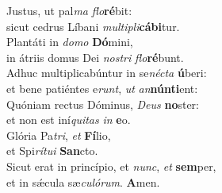\evenverse Justus, ut pal\textit{ma} \textit{flo}\textbf{ré}bit:~\*\\
\evenverse sicut cedrus Líbani \textit{mul}\textit{ti}\textit{pli}\textbf{cá}\textbf{bi}tur.\\
\oddverse Plantáti in \textit{do}\textit{mo} \textbf{Dó}mini,~\*\\
\oddverse in átriis domus Dei \textit{no}\textit{stri} \textit{flo}\textbf{ré}bunt.\\
\evenverse Adhuc multiplicabúntur in se\textit{né}\textit{cta} \textbf{ú}beri:~\*\\
\evenverse et bene patiéntes e\textit{runt}, \textit{ut} \textit{an}\textbf{nún}\textbf{ti}ent:\\
\oddverse Quóniam rectus Dóminus, \textit{De}\textit{us} \textbf{no}ster:~\*\\
\oddverse et non est iní\textit{qui}\textit{tas} \textit{in} \textbf{e}o.\\
\evenverse Glória Pa\textit{tri}, \textit{et} \textbf{Fí}lio,~\*\\
\evenverse et Spi\textit{rí}\textit{tu}\textit{i} \textbf{San}cto.\\
\oddverse Sicut erat in princípio, et \textit{nunc}, \textit{et} \textbf{sem}per,~\*\\
\oddverse et in sǽcula sæ\textit{cu}\textit{ló}\textit{rum}. \textbf{A}men.\\
